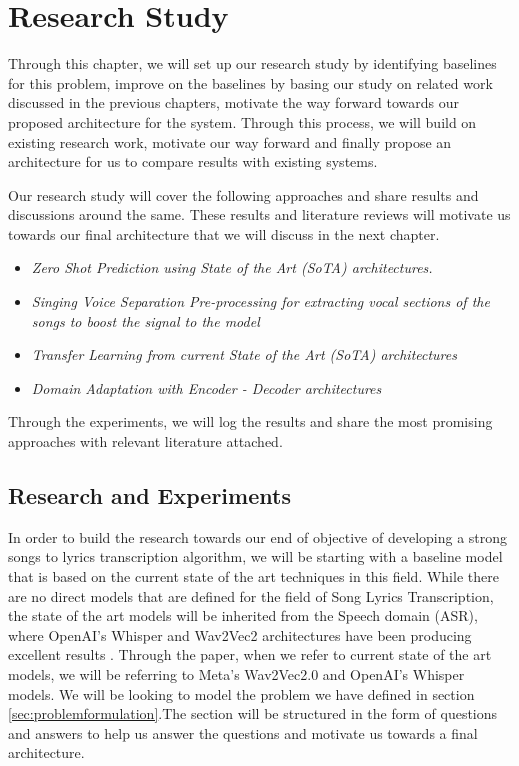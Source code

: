 
\chapter{Research Study}%
\label{sec:researchstudy}


Through this chapter, we will set up our research study by identifying baselines for this problem, improve on the baselines by basing our study on related work discussed in the previous chapters, motivate the way forward towards our proposed architecture for the system. Through this process, we will build on existing research work, motivate our way forward and finally propose an architecture for us to compare results with existing systems.

Our research study will cover the following approaches and share results and discussions around the same. These results and literature reviews will motivate us towards our final architecture that we will discuss in the next chapter.

\begin{itemize}
    \item \textit{Zero Shot Prediction using State of the Art (SoTA) architectures.}
    \item  \textit{Singing Voice Separation Pre-processing for extracting vocal sections of the songs to boost the signal to the model}
    \item  \textit{Transfer Learning from current State of the Art (SoTA) architectures}
    \item  \textit{Domain Adaptation with Encoder - Decoder architectures}
\end{itemize}

Through the experiments, we will log the results and share the most promising approaches with relevant literature attached.


\section{Research and Experiments}%
\label{sec:experiments}

In order to build the research towards our end of objective of developing a strong songs to lyrics transcription algorithm, we will be starting with a baseline model that is based on the current state of the art techniques in this field. While there are no direct models that are defined for the field of Song Lyrics Transcription, the state of the art models will be inherited from the Speech domain (ASR), where OpenAI's Whisper and Wav2Vec2 architectures have been producing excellent results \cite{baevski2020wav2vec} \cite{radford2023robust}. Through the paper, when we refer to current state of the art models, we will be referring to Meta's Wav2Vec2.0 and OpenAI's Whisper models. We will be looking to model the problem we have defined in section \ref{sec:problemformulation}.The section will be structured in the form of questions and answers to help us answer the questions and motivate us towards a final architecture.

